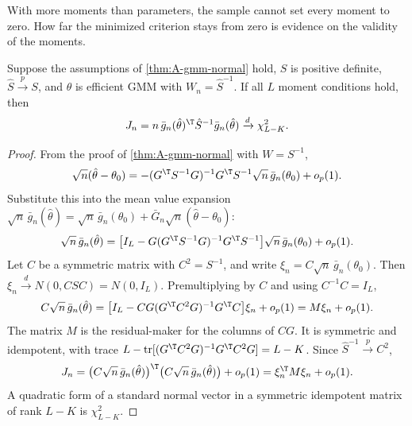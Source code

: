 With more moments than parameters, the sample cannot set every moment to zero. How far the minimized criterion stays
from zero is evidence on the validity of the moments.

\begin{theorem}\label{thm:A-jtest}
Suppose the assumptions of \cref{thm:A-gmm-normal} hold, $S$ is positive definite, $\hat S \xrightarrow{p} S$, and
$\hat\theta$ is efficient GMM with $W_n = \hat S^{-1}$. If all $L$ moment conditions hold, then
\begin{equation}\label{eq:A-jstat}
  J_n = n\,\bar g_n(\hat\theta)^\T\hat S^{-1}\bar g_n(\hat\theta) \xrightarrow{d} \chi^2_{L-K}.
\end{equation}
\end{theorem}

\begin{proof}
From the proof of \cref{thm:A-gmm-normal} with $W = S^{-1}$,
\begin{equation*}
  \sqrt{n}(\hat\theta - \theta_0) = -(G^\T S^{-1}G)^{-1}G^\T S^{-1}\sqrt{n}\,\bar g_n(\theta_0) + o_p(1).
\end{equation*}
Substitute this into the mean value expansion $\sqrt{n}\,\bar g_n(\hat\theta) = \sqrt{n}\,\bar g_n(\theta_0) +
\bar G_n\sqrt{n}(\hat\theta - \theta_0)$:
\begin{equation*}
  \sqrt{n}\,\bar g_n(\hat\theta) = \big[I_L - G(G^\T S^{-1}G)^{-1}G^\T S^{-1}\big]\sqrt{n}\,\bar g_n(\theta_0) + o_p(1).
\end{equation*}
Let $C$ be a symmetric matrix with $C^2 = S^{-1}$, and write $\xi_n = C\sqrt{n}\,\bar g_n(\theta_0)$. Then
$\xi_n \xrightarrow{d} N(0, CSC) = N(0, I_L)$. Premultiplying by $C$ and using $C^{-1}C = I_L$,
\begin{equation*}
  C\sqrt{n}\,\bar g_n(\hat\theta) = \big[I_L - CG(G^\T C^2G)^{-1}G^\T C\big]\xi_n + o_p(1) = M\xi_n + o_p(1).
\end{equation*}
The matrix $M$ is the residual-maker for the columns of $CG$. It is symmetric and idempotent, with trace
$L - \mathrm{tr}[(G^\T C^2G)^{-1}G^\T C^2G] = L - K$. Since $\hat S^{-1} \xrightarrow{p} C^2$,
\begin{equation*}
  J_n = \big(C\sqrt{n}\,\bar g_n(\hat\theta)\big)^\T\big(C\sqrt{n}\,\bar g_n(\hat\theta)\big) + o_p(1)
  = \xi_n^\T M\xi_n + o_p(1).
\end{equation*}
A quadratic form of a standard normal vector in a symmetric idempotent matrix of rank $L - K$ is $\chi^2_{L-K}$.
\end{proof}

